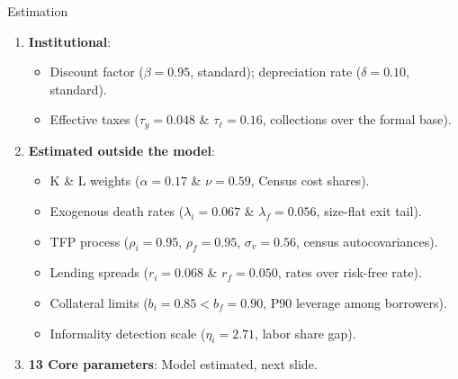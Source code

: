 \documentclass[aspectratio=169]{beamer}
\begin{document}
\begin{frame}{Estimation}\label{estimation}
 
\begin{enumerate}
    \item \textbf{Institutional}:
    \begin{itemize}
        \item Discount factor ($\beta=0.95$, standard); depreciation rate ($\delta=0.10$, standard).
        \item Effective taxes ($\tau_y=0.048$ \& $\tau_\ell=0.16$, collections over the formal base).
    \end{itemize}
    \vspace{4mm}\pause
    \item \textbf{Estimated outside the model}:
    \begin{itemize}
        \item K \& L weights ($\alpha=0.17$ \& $\nu=0.59$, Census cost shares).
        \item Exogenous death rates ($\lambda_i=0.067$ \& $\lambda_f=0.056$, size-flat exit tail).
        \item TFP process ($\rho_i=0.95$, $\rho_f=0.95$, $\sigma_v=0.56$, census autocovariances).
        \item Lending spreads ($r_i=0.068$ \& $r_f=0.050$, rates over risk-free rate).
        \item Collateral limits ($b_i=0.85 < b_f=0.90$, P90 leverage among borrowers).
        \item Informality detection scale ($\eta_i=2.71$, labor share gap).
    \end{itemize}
    \vspace{4mm}\pause
    \item \textbf{13 Core parameters}: Model estimated, next slide.
\end{enumerate}
 
\end{frame}
 
 
\end{document}
